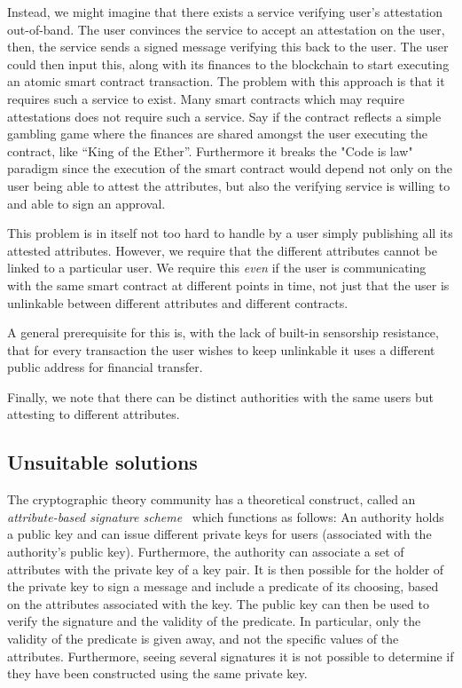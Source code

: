 \documentclass[11pt]{article} %
\begin{document}
Instead, we might imagine that there exists a service verifying user's
attestation out-of-band. The user convinces the service to accept an
attestation on the user, then, the service sends a signed message
verifying this back to the user. The user could then input this, along
with its finances to the blockchain to start executing an atomic smart
contract transaction. The problem with this approach is that it
requires such a service to exist. Many smart contracts which may
require attestations does not require such a service.  Say if the
contract reflects a simple gambling game where the finances are shared
amongst the user executing the contract, like ``King of the
Ether''. Furthermore it breaks the "Code is law" paradigm since the
execution of the smart contract would depend not only on the user
being able to attest the attributes, but also the verifying service is
willing to and able to sign an approval.

This problem is in itself not too hard to handle by a user simply publishing all its attested attributes. However, we require that the different attributes cannot be linked to a particular user. We require this \emph{even} if the user is communicating with the same smart contract at different points in time, not just that the user is unlinkable between different attributes and different contracts.

A general prerequisite for this is, with the lack of built-in sensorship resistance, that for every transaction the user wishes to keep unlinkable it uses a different public address for financial transfer. 

Finally, we note that there can be distinct authorities with the same users but attesting to different attributes.

\subsection{Unsuitable solutions}
The cryptographic theory community has a theoretical construct, called an \emph{attribute-based signature scheme}~\cite{MPR11} which functions as follows: An authority holds a public key and can issue different private keys for users (associated with the authority's public key). Furthermore, the authority can associate a set of attributes with the private key of a key pair. It is then possible for the holder of the private key to sign a message and include a predicate of its choosing, based on the attributes associated with the key. The public key can then be used to verify the signature and the validity of the predicate. In particular, only the validity of the predicate is given away, and not the specific values of the attributes. Furthermore, seeing several signatures it is not possible to determine if they have been constructed using the same private key. 
\end{document}
